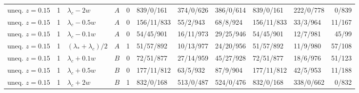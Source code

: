 \begin{longtable}{@{}lrllrlllllr@{}}
uneq. $z{=}0.15$ & 1 & $\lambda_c-2w$ & $A$ & 0 & 839/0/161 & 374/0/626 & 386/0/614 & 839/0/161 & 222/0/778 & 0/839\\
uneq. $z{=}0.15$ & 1 & $\lambda_c-0.5w$ & $A$ & 0 & 156/11/833 & 55/2/943 & 68/8/924 & 156/11/833 & 33/3/964 & 11/167\\
uneq. $z{=}0.15$ & 1 & $\lambda_c-0.1w$ & $A$ & 0 & 54/45/901 & 16/11/973 & 29/25/946 & 54/45/901 & 12/7/981 & 45/99\\
uneq. $z{=}0.15$ & 1 & $(\lambda_*+\lambda_c)/2$ & $A$ & 1 & 51/57/892 & 10/13/977 & 24/20/956 & 51/57/892 & 11/9/980 & 57/108\\
uneq. $z{=}0.15$ & 1 & $\lambda_c+0.1w$ & $B$ & 0 & 72/51/877 & 27/14/959 & 45/27/928 & 72/51/877 & 18/6/976 & 51/123\\
uneq. $z{=}0.15$ & 1 & $\lambda_c+0.5w$ & $B$ & 0 & 177/11/812 & 63/5/932 & 87/9/904 & 177/11/812 & 42/5/953 & 11/188\\
uneq. $z{=}0.15$ & 1 & $\lambda_c+2w$ & $B$ & 1 & 832/0/168 & 513/0/487 & 524/0/476 & 832/0/168 & 338/0/662 & 0/832\\
\bottomrule
\end{longtable}
